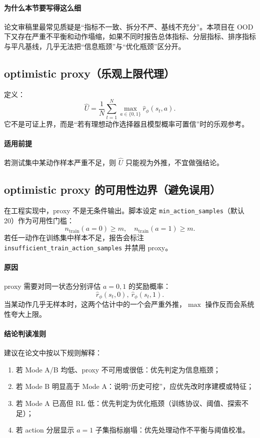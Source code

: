 ﻿\documentclass[11pt,a4paper]{ctexart}
\begin{document}
\paragraph{为什么本节要写得这么细}
论文审稿里最常见质疑是“指标不一致、拆分不严、基线不充分”。本项目在 OOD 下又存在严重不平衡和动作塌缩，如果不同时报告总体指标、分层指标、排序指标与平凡基线，几乎无法把“信息瓶颈”与“优化瓶颈”区分开。

\subsection{optimistic proxy（乐观上限代理）}
定义：
\begin{equation}
\hat U=\frac{1}{N}\sum_{t=1}^N \max_{a\in\{0,1\}}\hat r_\phi(s_t,a).
\end{equation}
它不是可证上界，而是“若有理想动作选择器且模型概率可置信”时的乐观参考。

\paragraph{适用前提}
若测试集中某动作样本严重不足，则 $\hat U$ 只能视为外推，不宜做强结论。

\subsection{optimistic proxy 的可用性边界（避免误用）}
在工程实现中，proxy 不是无条件输出。脚本设定 \texttt{min\_action\_samples}（默认 20）作为可用性门槛：
\begin{equation}
n_{\text{train}}(a=0)\ge m,\quad n_{\text{train}}(a=1)\ge m.
\end{equation}
若任一动作在训练集中样本不足，报告会标注
\texttt{insufficient\_train\_action\_samples} 并禁用 proxy。

\paragraph{原因}
proxy 需要对同一状态分别评估 \(a=0,1\) 的奖励概率：
\begin{equation}
\hat r_\phi(s_t,0),\ \hat r_\phi(s_t,1).
\end{equation}
当某动作几乎无样本时，这两个估计中的一个会严重外推，\(\max\) 操作反而会系统性夸大上限。

\paragraph{结论判读准则}
建议在论文中按以下规则解释：
\begin{enumerate}[leftmargin=*]
  \item 若 Mode A/B 均低、proxy 不可用或很低：优先判定为信息瓶颈；
  \item 若 Mode B 明显高于 Mode A：说明“历史可挖”，应优先改时序建模或特征；
  \item 若 Mode A 已高但 RL 低：优先判定为优化瓶颈（训练协议、阈值、探索不足）；
  \item 若 action 分层显示 \(a=1\) 子集指标崩塌：优先处理动作不平衡与阈值校准。
\end{enumerate}
\end{document}
